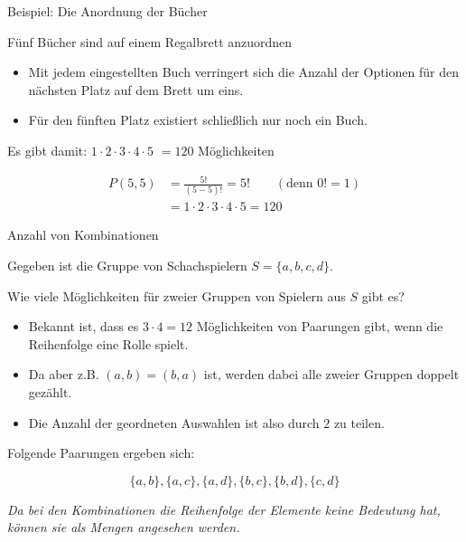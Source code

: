 \documentclass[12pt,ngerman,a4paper,ignorenonframetext,]{beamer}
\begin{document}
\begin{frame}{Beispiel: Die Anordnung der Bücher}
\protect\hypertarget{beispiel-die-anordnung-der-bucher}{}

Fünf Bücher sind auf einem Regalbrett anzuordnen

\begin{itemize}
        \item   Mit jedem eingestellten Buch verringert sich die Anzahl 
                der Optionen für den nächsten Platz auf dem Brett um eins.
        \item   Für den fünften Platz existiert schließlich nur noch ein Buch.
\end{itemize}

Es gibt damit: \(1 \cdot 2 \cdot 3 \cdot 4 \cdot 5\) \(= 120\)
Möglichkeiten

\begin{align*}
        P(5,5)  &= \frac{5!}{(5-5)!} = 5! \qquad (\text{denn }0!=1) \\
                &= 1 \cdot 2 \cdot 3 \cdot 4 \cdot 5 = 120
\end{align*}

\end{frame}

\begin{frame}{Anzahl von Kombinationen}
\protect\hypertarget{anzahl-von-kombinationen}{}

Gegeben ist die Gruppe von Schachspielern \(S=\{a,b,c,d\}\).

Wie viele Möglichkeiten für zweier Gruppen von Spielern aus \(S\) gibt
es?

\begin{itemize}
\item
  Bekannt ist, dass es \(3 \cdot 4 = 12\) Möglichkeiten von Paarungen
  gibt, wenn die Reihenfolge eine Rolle spielt.
\item
  Da aber \mbox{z.\thinspace{}B.}\xspace{} \((a,b) = (b,a)\) ist, werden
  dabei alle zweier Gruppen doppelt gezählt.
\item
  Die Anzahl der geordneten Auswahlen ist also durch \(2\) zu teilen.
\end{itemize}

Folgende Paarungen ergeben sich:

\begin{equation*}
    \{a,b\}, \{a,c\}, \{a,d\}, \{b,c\}, \{b,d\}, \{c,d\}
\end{equation*}

\emph{Da bei den Kombinationen die Reihenfolge der Elemente keine
Bedeutung hat, können sie als Mengen angesehen werden.}

\end{frame}
\end{document}
